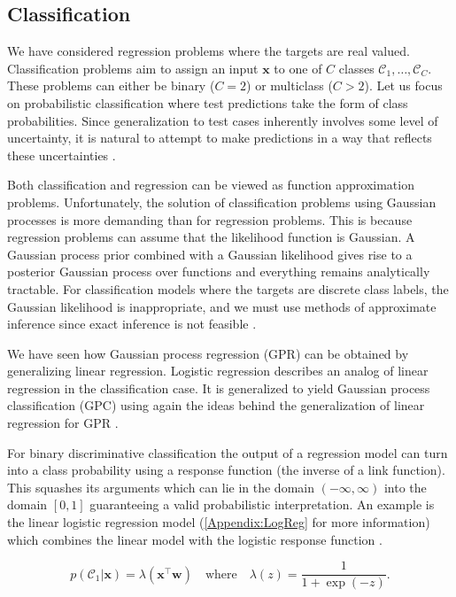 \documentclass[../../../main.tex]{subfiles}
\begin{document}
\subsection{Classification}

We have considered regression problems where the targets are real valued. Classification problems aim to assign an input $\bm{x}$ to one of $C$ classes $\mathcal{C}_1,\ldots,\mathcal{C}_C$. These problems can either be binary ($C=2$) or multiclass ($C>2$). Let us focus on probabilistic classification where test predictions take the form of class probabilities. Since generalization to test cases inherently involves some level of uncertainty, it is natural to attempt to make predictions in a way that reflects these uncertainties \autocite{Rasmussen2005}.

Both classification and regression can be viewed as function approximation problems. Unfortunately, the solution of classification problems using Gaussian processes is more demanding than for regression problems. This is because regression problems can assume that the likelihood function is Gaussian. A Gaussian process prior combined with a Gaussian likelihood gives rise to a posterior Gaussian process over functions and everything remains analytically tractable. For classification models where the targets are discrete class labels, the Gaussian likelihood is inappropriate, and we must use methods of approximate inference since exact inference is not feasible \autocite{Rasmussen2005}.

We have seen how Gaussian process regression (GPR) can be obtained by generalizing linear regression. Logistic regression describes an analog of linear regression in the classification case. It is generalized to yield Gaussian process classification (GPC) using again the ideas behind the generalization of linear regression for GPR \autocite{Rasmussen2005}.

For binary discriminative classification the output of a regression model can turn into a class probability using a response function (the inverse of a link function). This squashes its arguments which can lie in the domain $(-\infty,\infty)$ into the domain $[0,1]$ guaranteeing a valid probabilistic interpretation. An example is the linear logistic regression model (\autoref{Appendix:LogReg} for more information) which combines the linear model with the logistic response function \autocite{Rasmussen2005}.

\begin{equation}
p(\mathcal{C}_1|\bm{x})=\lambda(\bm{x}^\top\bm{w}) \quad \text{where} \quad \lambda(z)=\frac{1}{1+\exp(-z)}.
\label{Equation:ResponseFunction}
\end{equation}
\end{document}
